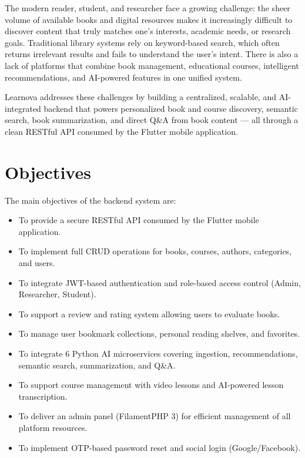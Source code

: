 The modern reader, student, and researcher face a growing challenge: the sheer
volume of available books and digital resources makes it increasingly difficult
to discover content that truly matches one's interests, academic needs, or
research goals. Traditional library systems rely on keyword-based search, which
often returns irrelevant results and fails to understand the user's intent.
There is also a lack of platforms that combine book management, educational
courses, intelligent recommendations, and AI-powered features in one unified
system.

Learnova addresses these challenges by building a centralized, scalable, and
AI-integrated backend that powers personalized book and course discovery,
semantic search, book summarization, and direct Q\&A from book content ---
all through a clean RESTful API consumed by the Flutter mobile application.

\section{Objectives}
\label{sec:ch4objectives}

The main objectives of the backend system are:

\begin{itemize}
  \item To provide a secure RESTful API consumed by the Flutter mobile
        application.
  \item To implement full CRUD operations for books, courses, authors,
        categories, and users.
  \item To integrate JWT-based authentication and role-based access control
        (Admin, Researcher, Student).
  \item To support a review and rating system allowing users to evaluate books.
  \item To manage user bookmark collections, personal reading shelves, and
        favorites.
  \item To integrate 6 Python AI microservices covering ingestion,
        recommendations, semantic search, summarization, and Q\&A.
  \item To support course management with video lessons and AI-powered lesson
        transcription.
  \item To deliver an admin panel (FilamentPHP 3) for efficient management of
        all platform resources.
  \item To implement OTP-based password reset and social login
        (Google/Facebook).
\end{itemize}

